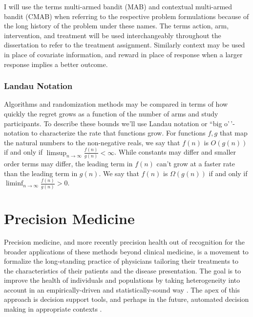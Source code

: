 \documentclass[12pt,,letterpaper,twoside]{report}
\begin{document}
I will use the terms multi-armed bandit (MAB) and contextual multi-armed
bandit (CMAB) when referring to the respective problem formulations
because of the long history of the problem under these names. The terms
action, arm, intervention, and treatment will be used interchangeably
throughout the dissertation to refer to the treatment assignment.
Similarly context may be used in place of covariate information, and
reward in place of response when a larger response implies a better
outcome.

\subsubsection{Landau Notation}

Algorithms and randomization methods may be compared in terms of how
quickly the regret grows as a function of the number of arms and study
participants. To describe these bounds we'll use Landau notation or
``big o'\,'-notation to characterize the rate that functions grow. For
functions \(f, g\) that map the natural numbers to the non-negative
reals, we say that \(f(n)\) is \(O\left(g(n)\right)\) if and only if
\(\limsup_{n \to \infty}\frac{f(n)}{g(n)} < \infty\). While constants
may differ and smaller order terms may differ, the leading term in
\(f(n)\) can't grow at a faster rate than the leading term in \(g(n)\).
We say that \(f(n)\) is \(\Omega \left(g(n)\right)\) if and only if
\(\liminf_{n \to \infty}\frac{f(n)}{g(n)} > 0\).

\hypertarget{precision-medicine}{%
\section{Precision Medicine}\label{precision-medicine}}

Precision medicine, and more recently precision health out of
recognition for the broader applications of these methods beyond
clinical medicine, is a movement to formalize the long-standing practice
of physicians tailoring their treatments to the characteristics of their
patients and the disease presentation. The goal is to improve the health
of individuals and populations by taking heterogeneity into account in
an empirically-driven and statistically-sound way
\citep{kosorok2015adaptive, kosorok2019precision}. The apex of this
approach is decision support tools, and perhaps in the future, automated
decision making in appropriate contexts \citep{sperger2020future}.
\end{document}
